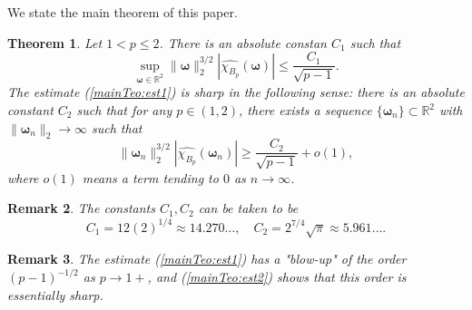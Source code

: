 \documentclass{amsart}
\newtheorem{theorem}{Theorem}[section]
\newtheorem{rem}[theorem]{Remark}
\numberwithin{equation}{section}
\begin{document}
We state the main theorem of this paper.
\begin{theorem}
\label{MainTeo:1p2}
Let $1<p\le2$. There is an absolute constan $C_1$ such that 
\begin{equation}
    \label{mainTeo:est1}
    \sup_{\boldsymbol{\omega}\in\mathbb{R}^2}\|\boldsymbol{\omega}\|_2^{3/2}|\widehat{\chi_{B_p}}(\boldsymbol{\omega})|\le\frac{C_1}{\sqrt{p-1}}.
\end{equation}
The estimate (\ref{mainTeo:est1}) is sharp in the following sense: there is an absolute constant $C_2$ such that for any $p\in(1,2)$, there exists a sequence $\{\boldsymbol{\omega}_n\}\subset\mathbb{R}^2$ with $\|\boldsymbol{\omega}_n\|_2\rightarrow\infty$ such that
\begin{equation}
    \label{mainTeo:est2}
    \|\boldsymbol{\omega}_n\|_2^{3/2}|\widehat{\chi_{B_p}}(\boldsymbol{\omega}_n)|\ge\frac{C_2}{\sqrt{p-1}}+o(1),
\end{equation}
where $o(1)$ means a term tending to $0$ as $n\rightarrow\infty$.
\end{theorem}
\begin{rem}
The constants $C_1,C_2$ can be taken to be
$$
C_1=12(2)^{1/4}\approx 14.270\ldots, \quad C_2=2^{7/4}\sqrt{\pi}\approx 5.961\ldots.
$$
\end{rem}
\begin{rem}
The estimate (\ref{mainTeo:est1}) has a "blow-up" of the order $(p-1)^{-1/2}$ as $p\rightarrow1+$, and (\ref{mainTeo:est2}) shows that this order is essentially sharp.
\end{rem}
\end{document}
